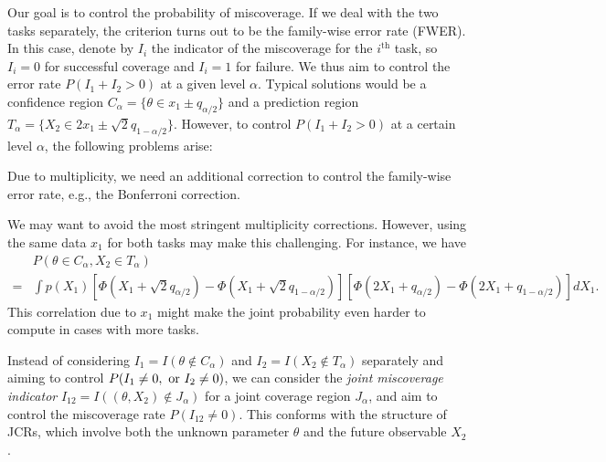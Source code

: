 \documentclass[english]{article}
\begin{document}
Our goal is to control the probability of miscoverage.
If we deal with the two tasks separately,
the criterion turns out to be the family-wise error rate (FWER).
In this case,
denote by $I_i$ the indicator of the miscoverage for the $i^{\mathrm{th}}$ task, so $I_i = 0$ for successful coverage and $I_i = 1$ for failure.
We thus aim to control the error rate $P(I_1 + I_2 > 0)$ at a given level $\alpha$.
Typical solutions 
would be a confidence region $C_\alpha=\{\theta \in x_1 \pm q_{\alpha/2}\}$ and a prediction region $T_\alpha=\{X_2 \in 2x_1 \pm \sqrt{2}q_{1-\alpha/2}\}$.
However, to control $P(I_1 + I_2 > 0)$ at a certain level $\alpha$, the following problems arise:
\begin{compactitem}
    \item %
    Due to multiplicity, we need an additional correction to control the family-wise error rate, e.g., the Bonferroni correction.
    \item We may want to avoid the most stringent multiplicity corrections. 
    However, using the same data $x_1$ for both tasks may make this challenging. For instance, we have
    \begin{align*}
        &P(\theta \in C_\alpha, X_2 \in T_\alpha)\\
        =& \int p(X_1)[\Phi(X_1 + \sqrt{2}q_{\alpha/2}) - \Phi(X_1 + \sqrt{2}q_{1-\alpha/2})][\Phi(2X_1 + q_{\alpha/2}) - \Phi(2X_1 + q_{1-\alpha/2})] dX_1.
    \end{align*}
    This correlation due to $x_1$
    might make the joint probability even harder to compute in cases with more tasks.
\end{compactitem}

Instead of considering $I_1 = I(\theta \notin C_\alpha)$ and $I_2 = I(X_2 \notin T_\alpha)$ separately and aiming to control $P(I_1\neq0, \textnormal{ or } I_2\neq 0)$, 
we can consider the \emph{joint miscoverage indicator}
$I_{12}=I((\theta,X_2) \notin J_\alpha)$
for a joint coverage region $J_\alpha$, 
and aim to control 
the miscoverage rate $P(I_{12}\neq0)$.
This conforms with the structure of JCRs, which involve both the unknown parameter $\theta$ and the future observable $X_2$.
\end{document}

